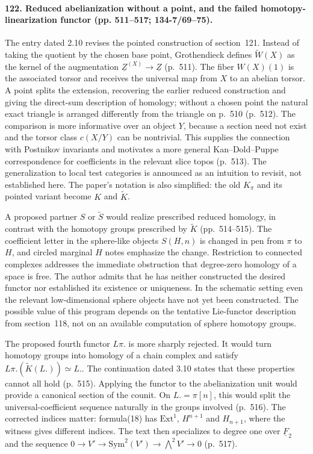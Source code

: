 \paragraph{122. Reduced abelianization without a point, and the failed homotopy-linearization functor (pp. 511--517; 134-7/69--75).}
The entry dated 2.10 revises the pointed construction of section~121. Instead of taking the quotient by the chosen base point, Grothendieck defines $\widetilde W(X)$ as the kernel of the augmentation $\underline Z^{(X)}\to\underline Z$ (p.~511). The fiber $W(X)(1)$ is the associated torsor and receives the universal map from $X$ to an abelian torsor. A point splits the extension, recovering the earlier reduced construction and giving the direct-sum description of homology; without a chosen point the natural exact triangle is arranged differently from the triangle on p.~510 (p.~512). The comparison is more informative over an object $Y$, because a section need not exist and the torsor class $c(X/Y)$ can be nontrivial. This supplies the connection with Postnikov invariants and motivates a more general Kan--Dold--Puppe correspondence for coefficients in the relevant slice topos (p.~513). The generalization to local test categories is announced as an intuition to revisit, not established here. The paper's notation is also simplified: the old $K_\pi$ and its pointed variant become $K$ and $\widetilde K$.

A proposed partner $S$ or $\widetilde S$ would realize prescribed reduced homology, in contrast with the homotopy groups prescribed by $\widetilde K$ (pp.~514--515). The coefficient letter in the sphere-like objects $S(H,n)$ is changed in pen from $\pi$ to $H$, and circled marginal $H$ notes emphasize the change. Restriction to connected complexes addresses the immediate obstruction that degree-zero homology of a space is free. The author admits that he has neither constructed the desired functor nor established its existence or uniqueness. In the schematic setting even the relevant low-dimensional sphere objects have not yet been constructed. The possible value of this program depends on the tentative Lie-functor description from section~118, not on an available computation of sphere homotopy groups.

The proposed fourth functor $L\pi.$ is more sharply rejected. It would turn homotopy groups into homology of a chain complex and satisfy $L\pi.(\widetilde K(L.))\simeq L.$. The continuation dated 3.10 states that these properties cannot all hold (p.~515). Applying the functor to the abelianization unit would provide a canonical section of the counit. On $L.=\pi[n]$, this would split the universal-coefficient sequence naturally in the groups involved (p.~516). The corrected indices matter: formula(18) has $\mathrm{Ext}^1$, $H^{n+1}$ and $H_{n+1}$, where the witness gives different indices. The text then specializes to degree one over $\underline F_2$ and the sequence $0\to V'\to\mathrm{Sym}^2(V')\to\bigwedge^2V'\to0$ (p.~517).

